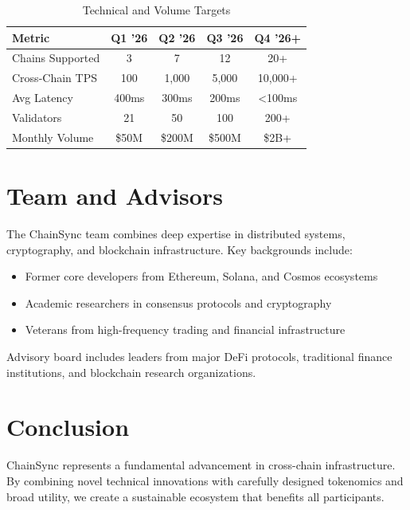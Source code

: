 \documentclass[12pt,a4paper]{article}
\begin{document}
\begin{table}[h]
\centering
\begin{tabular}{lcccc}
\toprule
\textbf{Metric} & \textbf{Q1 '26} & \textbf{Q2 '26} & \textbf{Q3 '26} & \textbf{Q4 '26+} \\
\midrule
Chains Supported & 3 & 7 & 12 & 20+ \\
Cross-Chain TPS & 100 & 1,000 & 5,000 & 10,000+ \\
Avg Latency & 400ms & 300ms & 200ms & <100ms \\
Validators & 21 & 50 & 100 & 200+ \\
Monthly Volume & \$50M & \$200M & \$500M & \$2B+ \\
\bottomrule
\end{tabular}
\caption{Technical and Volume Targets}
\end{table}

\section{Team and Advisors}

The ChainSync team combines deep expertise in distributed systems, cryptography, and blockchain infrastructure. Key backgrounds include:

\begin{itemize}
    \item Former core developers from Ethereum, Solana, and Cosmos ecosystems
    \item Academic researchers in consensus protocols and cryptography
    \item Veterans from high-frequency trading and financial infrastructure
\end{itemize}

Advisory board includes leaders from major DeFi protocols, traditional finance institutions, and blockchain research organizations.

\section{Conclusion}

ChainSync represents a fundamental advancement in cross-chain infrastructure. By combining novel technical innovations with carefully designed tokenomics and broad utility, we create a sustainable ecosystem that benefits all participants.
\end{document}
